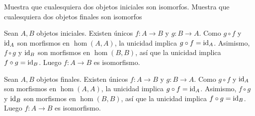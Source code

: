\begin{nejer}
Muestra que cualesquiera dos objetos iniciales son isomorfos. Muestra que cualesquiera dos objetos finales son isomorfos
\end{nejer}
\begin{sol}
Sean $A,B$ objetos iniciales. Existen únicos $f\colon A\to B$ y $g\colon B\to A$. Como $g\circ f$ y $\operatorname{id}_A$ son morfismos en $\hom(A,A)$, la unicidad implica $g\circ f=\operatorname{id}_A$. Asimismo, $f\circ g$ y $\operatorname{id}_B$ son morfismos en $\hom(B,B)$, así que la unicidad implica $f\circ g=\operatorname{id}_B$. Luego $f  \colon A \to B$ es isomorfismo.

Sean $A,B$ objetos finales. Existen únicos $f\colon A\to B$ y $g\colon B\to A$. Como $g\circ f$ y $\operatorname{id}_A$ son morfismos en $\hom(A,A)$, la unicidad implica $g\circ f=\operatorname{id}_A$. Asimismo, $f\circ g$ y $\operatorname{id}_B$ son morfismos en $\hom(B,B)$, así que la unicidad implica $f\circ g=\operatorname{id}_B$. Luego $f \colon A \to B$ es isomorfismo.
\end{sol}

